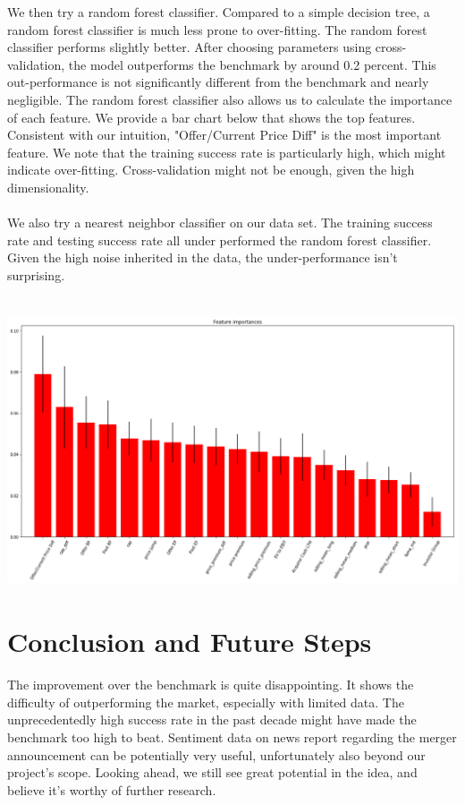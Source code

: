 \documentclass[a4paper]{article}
\begin{document}
We then try a random forest classifier. Compared to a simple decision tree, a random forest classifier is much less prone to over-fitting. The random forest classifier performs slightly better. After choosing parameters using cross-validation, the model outperforms the benchmark by around 0.2 percent. This out-performance is not significantly different from the benchmark and nearly negligible. The random forest classifier also allows us to calculate the importance of each feature. We provide a bar chart below that shows the top features. Consistent with our intuition, "Offer/Current Price Diff" is the most important feature. We note that the training success rate is particularly high, which might indicate over-fitting. Cross-validation might not be enough, given the high dimensionality.
\\
\\
We also try a nearest neighbor classifier on our data set. The training success rate and testing success rate all under performed the random forest classifier. Given the high noise inherited in the data, the under-performance isn't surprising.
\\
\\

\begin{center}
\includegraphics[width=14cm, height=8cm]{Feature_Importance.png} 

\end{center}


\section{Conclusion and Future Steps }
\label{sec:conclusion}

The improvement over the benchmark is quite disappointing. It shows the difficulty of outperforming the market, especially with limited data. The unprecedentedly high success rate in the past decade might have made the benchmark too high to beat. Sentiment data on news report regarding the merger announcement can be potentially very useful, unfortunately also beyond our project's scope. Looking ahead, we still see great potential in the idea, and believe it's worthy of further research. 
\end{document}
